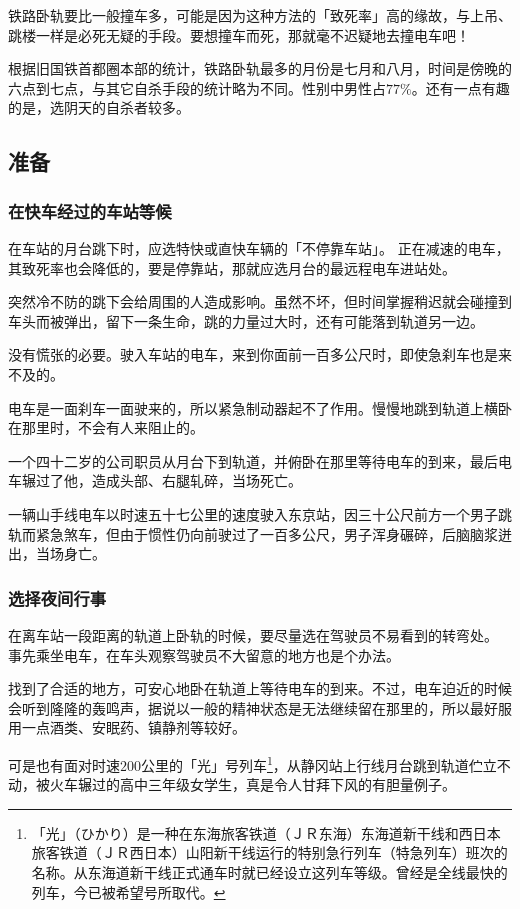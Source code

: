 \documentclass[UTF8]{ctexart}
\begin{document}
铁路卧轨要比一般撞车多，可能是因为这种方法的「致死率」高的缘故，与上吊、跳楼一样是必死无疑的手段。要想撞车而死，那就毫不迟疑地去撞电车吧！

根据旧国铁首都圈本部的统计，铁路卧轨最多的月份是七月和八月，时间是傍晚的六点到七点，与其它自杀手段的统计略为不同。性别中男性占$77\%$。还有一点有趣的是，选阴天的自杀者较多。

\subsection{准备}

\subsubsection*{在快车经过的车站等候}

在车站的月台跳下时，应选特快或直快车辆的「不停靠车站」。
正在减速的电车，其致死率也会降低的，要是停靠站，那就应选月台的最远程电车进站处。

突然冷不防的跳下会给周围的人造成影响。虽然不坏，但时间掌握稍迟就会碰撞到车头而被弹出，留下一条生命，跳的力量过大时，还有可能落到轨道另一边。

没有慌张的必要。驶入车站的电车，来到你面前一百多公尺时，即使急刹车也是来不及的。 

电车是一面刹车一面驶来的，所以紧急制动器起不了作用。慢慢地跳到轨道上横卧在那里时，不会有人来阻止的。

一个四十二岁的公司职员从月台下到轨道，并俯卧在那里等待电车的到来，最后电车辗过了他，造成头部、右腿轧碎，当场死亡。 

一辆山手线电车以时速五十七公里的速度驶入东京站，因三十公尺前方一个男子跳轨而紧急煞车，但由于惯性仍向前驶过了一百多公尺，男子浑身碾碎，后脑脑浆迸出，当场身亡。

\subsubsection*{选择夜间行事}

在离车站一段距离的轨道上卧轨的时候，要尽量选在驾驶员不易看到的转弯处。
事先乘坐电车，在车头观察驾驶员不大留意的地方也是个办法。

找到了合适的地方，可安心地卧在轨道上等待电车的到来。不过，电车迫近的时候会听到隆隆的轰鸣声，据说以一般的精神状态是无法继续留在那里的，所以最好服用一点酒类、安眠药、镇静剂等较好。

可是也有面对时速$200$公里的「光」号列车\footnote{「光」（ひかり）是一种在东海旅客铁道（ＪＲ东海）东海道新干线和西日本旅客铁道（ＪＲ西日本）山阳新干线运行的特别急行列车（特急列车）班次的名称。从东海道新干线正式通车时就已经设立这列车等级。曾经是全线最快的列车，今已被希望号所取代。}，从静冈站上行线月台跳到轨道伫立不动，被火车辗过的高中三年级女学生，真是令人甘拜下风的有胆量例子。
\end{document}

